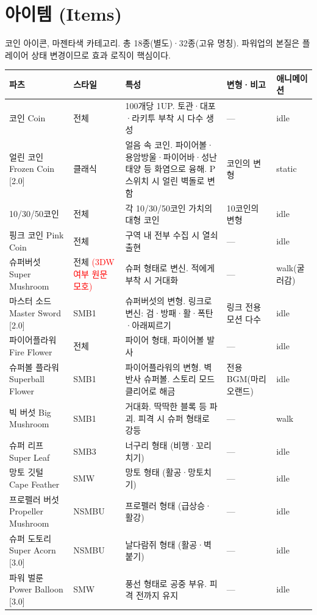\documentclass[10pt,a4paper]{article}
\begin{document}
\section{아이템 (Items)}

코인 아이콘, 마젠타색 카테고리. 총 18종(별도)·32종(고유 명칭).
파워업의 본질은 플레이어 상태 변경이므로 효과 로직이 핵심이다.

\begin{longtable}{L{2.9cm} L{1.5cm} L{6.6cm} L{2.6cm} L{1.5cm}}
\toprule
\textbf{파츠} & \textbf{스타일} & \textbf{특성} & \textbf{변형·비고} & \textbf{애니메이션} \\
\midrule
\endhead
코인 Coin & 전체 & 100개당 1UP. 토관·대포·라키투 부착 시 다수 생성 & — & idle \\
얼린 코인 Frozen Coin [2.0] & 클래식 & 얼음 속 코인. 파이어볼·용암방울·파이어바·성난 태양 등 화염으로 융해. P스위치 시 얼린 벽돌로 변함 & 코인의 변형 & static \\
10/30/50코인 & 전체 & 각 10/30/50코인 가치의 대형 코인 & 10코인의 변형 & idle \\
핑크 코인 Pink Coin & 전체 & 구역 내 전부 수집 시 열쇠 출현 & — & idle \\
슈퍼버섯 Super Mushroom & 전체 \textcolor{red}{(3DW 여부 원문 모호)} & 슈퍼 형태로 변신. 적에게 부착 시 거대화 & — & walk(굴러감) \\
마스터 소드 Master Sword [2.0] & SMB1 & 슈퍼버섯의 변형. 링크로 변신: 검·방패·활·폭탄·아래찌르기 & 링크 전용 모션 다수 & idle \\
파이어플라워 Fire Flower & 전체 & 파이어 형태, 파이어볼 발사 & — & idle \\
슈퍼볼 플라워 Superball Flower & SMB1 & 파이어플라워의 변형. 벽 반사 슈퍼볼. 스토리 모드 클리어로 해금 & 전용 BGM(마리오랜드) & idle \\
빅 버섯 Big Mushroom & SMB1 & 거대화. 딱딱한 블록 등 파괴. 피격 시 슈퍼 형태로 강등 & — & walk \\
슈퍼 리프 Super Leaf & SMB3 & 너구리 형태 (비행·꼬리치기) & — & idle \\
망토 깃털 Cape Feather & SMW & 망토 형태 (활공·망토치기) & — & idle \\
프로펠러 버섯 Propeller Mushroom & NSMBU & 프로펠러 형태 (급상승·활강) & — & idle \\
슈퍼 도토리 Super Acorn [3.0] & NSMBU & 날다람쥐 형태 (활공·벽 붙기) & — & idle \\
파워 벌룬 Power Balloon [3.0] & SMW & 풍선 형태로 공중 부유. 피격 전까지 유지 & — & idle \\

\end{longtable}
\end{document}
